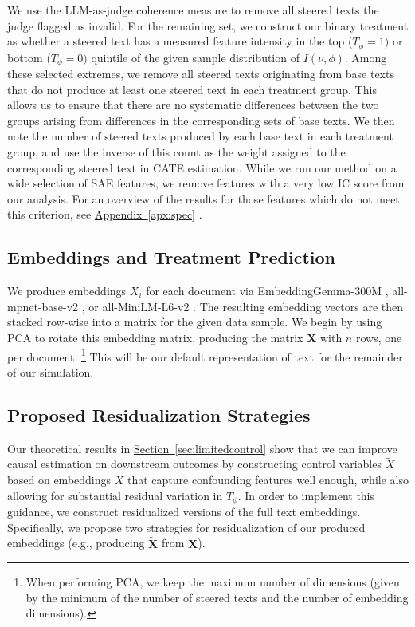 \documentclass{article}
\theoremstyle{plain}
\theoremstyle{definition}
\theoremstyle{remark}
\newcommand{\myref}[2]{%
    \hyperref[#2]{#1~\ref*{#2}}%
}
\begin{document}
We use the LLM-as-judge coherence measure to remove all steered texts the judge flagged as invalid. For the remaining set, we construct our binary treatment as whether a steered text has a measured feature intensity in the top ($T_\phi{=}1)$ or bottom ($T_\phi{=}0)$ quintile of the given sample distribution of $I(\nu,\phi)$. Among these selected extremes, we remove all steered texts originating from base texts that do not produce at least one steered text in each treatment group. This allows us to ensure that there are no systematic differences between the two groups arising from differences in the corresponding sets of base texts. We then note the number of steered texts produced by each base text in each treatment group, and use the inverse of this count as the weight assigned to the corresponding steered text in CATE estimation. While we run our method on a wide selection of SAE features, we remove features with a very low IC score from our analysis. For an overview of the results for those features which do not meet this criterion, see \myref{Appendix}{apx:spec}.

\subsection{Embeddings and Treatment Prediction}
We produce embeddings $X_i$ for each document via EmbeddingGemma-300M \citep{vera2025embeddinggemmapowerfullightweighttext}, all-mpnet-base-v2 \citep{song2020mpnetmaskedpermutedpretraining}, or all-MiniLM-L6-v2 \citep{wang2020minilmdeepselfattentiondistillation}. The resulting embedding vectors are then stacked row-wise into a matrix for the given data sample. We begin by using PCA to rotate this embedding matrix, producing the matrix $\mathbf{X}$ with $n$ rows, one per document.
\footnote{When performing PCA, we keep the maximum number of dimensions (given by the minimum of the number of steered texts and the number of embedding dimensions).}
This will be our default representation of text for the remainder of our simulation.

\subsection{Proposed Residualization Strategies}\label{sec:resid}

Our theoretical results in \myref{Section}{sec:limitedcontrol} show that we can improve causal estimation on downstream outcomes by constructing control variables $\tilde{X}$ based on embeddings $X$ that capture confounding features well enough, while also allowing for substantial residual variation in $T_\phi$.
In order to implement this guidance, we construct residualized versions of the full text embeddings. 
Specifically, we propose two strategies for residualization of our produced embeddings (e.g., producing $\mathbf{\widetilde{X}}$ from $\mathbf{X}$). 
\end{document}
